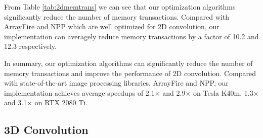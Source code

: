 \documentclass[sigplan,review,anonymous]{acmart}\settopmatter{printfolios=true,printccs=false,printacmref=false}
\begin{document}
From Table \ref{tab:2dmemtrans} we can see that our optimization algorithms significantly reduce the number of memory transactions. Compared with ArrayFire and NPP which are well optimized for 2D convolution, our implementation can averagely reduce memory transactions by a factor of 10.2 and 12.3 respectively.




In summary, our optimization algorithms can significantly reduce the number of memory transactions and improve the performance of 2D convolution. Compared with state-of-the-art image processing libraries, ArrayFire and NPP, our implementation achieves average speedups of 2.1$\times$ and 2.9$\times$ on Tesla K40m, 1.3$\times$ and 3.1$\times$ on RTX 2080 Ti.

\subsection{3D Convolution}
\end{document}
